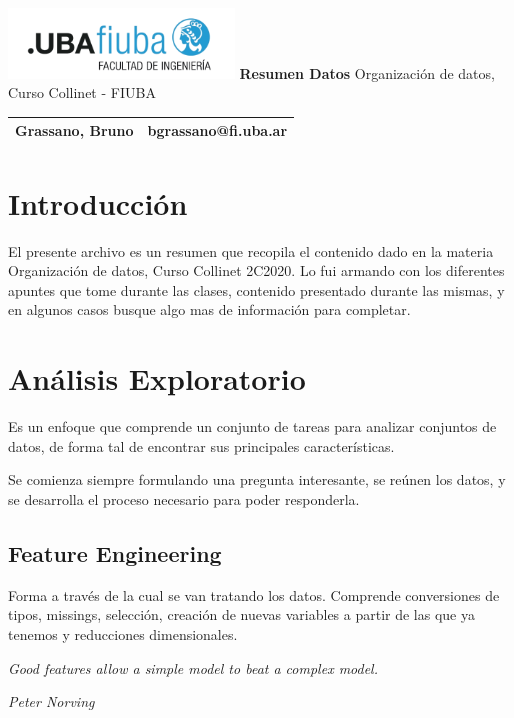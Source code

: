 \documentclass[titlepage,a4paper]{article}
\begin{document}
\begin{titlepage} %
	\hfill\includegraphics[width=6cm]{imagenesResumen/logofiuba.jpg}
    \centering
    \vfill
    \Huge \textbf{Resumen Datos}
    \vskip2cm
    \Large Organización de datos, Curso Collinet - FIUBA\\
    \vfill
    \begin{tabular}{ | l | l | }
      \hline
       Grassano, Bruno &  bgrassano@fi.uba.ar \\ \hline
  	\end{tabular}
    \vfill
    \vfill
\end{titlepage}

\tableofcontents %
\newpage

\section{Introducción}\label{sec:intro}
El presente archivo es un resumen que recopila el contenido dado en la materia Organización de datos, Curso Collinet 2C2020. Lo fui armando con los diferentes apuntes que tome durante las clases, contenido presentado durante las mismas, y en algunos casos busque algo mas de información para completar.

\section{Análisis Exploratorio}
Es un enfoque que comprende un conjunto de tareas para analizar conjuntos de datos, de forma tal de encontrar sus principales características.

Se comienza siempre formulando una pregunta interesante, se reúnen los datos, y se desarrolla el proceso necesario para poder responderla.

\subsection{Feature Engineering}
Forma a través de la cual se van tratando los datos. Comprende conversiones de tipos, missings, selección, creación de nuevas variables a partir de las que ya tenemos y reducciones dimensionales.

\begin{center}
    \textit{Good features allow a simple model to beat a complex model.}
    
    \textit{Peter Norving}
\end{center}
\end{document}

